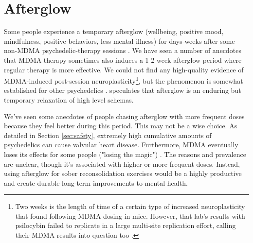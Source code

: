\documentclass[12pt,letterpaper]{book}
\begin{document}
\section{Afterglow}
\label{afterglow}
Some people experience a temporary afterglow (wellbeing, positive mood, mindfulness, positive behaviors, less mental illness) for days-weeks after some non-MDMA psychedelic-therapy sessions \cite{evansAfterglow}. We have seen a number of anecdotes that MDMA therapy sometimes also induces a 1-2 week afterglow period where regular therapy is more effective. We could not find any high-quality evidence of MDMA-induced post-session neuroplasticity\footnote{Two weeks is the length of time of a certain type of increased neuroplasticity that \textcite{nardouMDMAPlasticity} found following MDMA dosing in mice. However, that lab's results with psilocybin failed to replicate in a large multi-site replication effort, calling their MDMA results into question too \cite{Lu2025noplasticity}.}, but the phenomenon is somewhat established for other psychedelics \cite{calder2023towards}. \textcite{carhart2019rebus} speculates that afterglow is an enduring but temporary relaxation of high level schemas.

We've seen some anecdotes of people chasing afterglow with more frequent doses because they feel better during this period. This may not be a wise choice. As detailed in Section \ref{sec:safety}, extremely high cumulative amounts of psychedelics can cause valvular heart disease. Furthermore, MDMA eventually loses its effects for some people ("losing the magic") \cite{farreTolerance,parrottTolerance}. The reasons and prevalence are unclear, though it's associated with higher or more frequent doses. Instead, using afterglow for sober reconsolidation exercises would be a highly productive and create durable long-term improvements to mental health.
\end{document}
